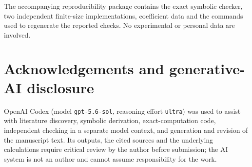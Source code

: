 \documentclass[11pt]{article}
\begin{document}
The accompanying reproducibility package contains the exact symbolic
checker, two independent finite-size implementations, coefficient data and
the commands used to regenerate the reported checks.  No experimental or
personal data are involved.

\section*{Acknowledgements and generative-AI disclosure}

OpenAI Codex (model \texttt{gpt-5.6-sol}, reasoning effort
\texttt{ultra}) was used to assist with literature discovery, symbolic
derivation, exact-computation code, independent checking in a separate model
context, and generation and revision of the manuscript text.  Its outputs,
the cited sources and the underlying calculations require critical review by
the author before submission; the AI system is not an author and cannot
assume responsibility for the work.



\end{document}
